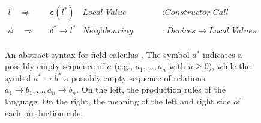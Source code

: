 \begin{figure}[!ht]
{\begin{minipage}{0.95\textwidth}
\begin{align*}
        l \quad\Rightarrow\quad    & \texttt{c}(l^*)                      & \textit{Local Value}          & : \textit{Constructor Call}                          \\
        \phi \quad\Rightarrow\quad & \delta^* \rightarrow l^*             & \textit{Neighbouring Value}   & : \textit{Devices} \rightarrow \textit{Local Values} \\
      \end{align*}
    \end{minipage}
  }
  \caption[An abstract syntax for field calculus]{
  An abstract syntax for field calculus \cite{FieldCalculus-AggregateComputing}.
  The symbol $a^*$ indicates a possibly empty sequence of $a$ (e.g.,
  $a_1,...,a_n$ with $n \geq 0$), while the symbol $a^*{\rightarrow}b^*$ a
  possibly empty sequence of relations $a_1{\rightarrow}b_1,...,a_n{\rightarrow}b_n$.
  On the left, the production rules of the language. On the right, the
  meaning of the left and right side of each production rule.
  }
  \label{figure:field-calculus-language}
\end{figure}

